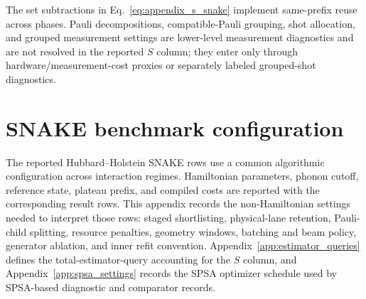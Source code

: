 \documentclass[
  reprint,
  amsmath,
  amssymb,
  aps,
  pra,
  nofootinbib,
  superscriptaddress,
  floatfix
]{revtex4-2}
\begin{document}
The set subtractions in Eq.~\eqref{eq:appendix_s_snake} implement same-prefix reuse across phases. Pauli decompositions, compatible-Pauli grouping, shot allocation, and grouped measurement settings are lower-level measurement diagnostics and are not resolved in the reported \(S\) column; they enter only through hardware/measurement-cost proxies or separately labeled grouped-shot diagnostics.

\section{SNAKE benchmark configuration}
\label{app:results_discussion}

The reported Hubbard--Holstein SNAKE rows use a common algorithmic
configuration across interaction regimes. Hamiltonian parameters, phonon
cutoff, reference state, plateau prefix, and compiled costs are reported with
the corresponding result rows. This appendix records the non-Hamiltonian
settings needed to interpret those rows: staged shortlisting, physical-lane
retention, Pauli-child splitting, resource penalties, geometry windows,
batching and beam policy, generator ablation, and inner refit convention.
Appendix~\ref{app:estimator_queries} defines the total-estimator-query
accounting for the \(S\) column, and Appendix~\ref{app:spsa_settings} records
the SPSA optimizer schedule used by SPSA-based diagnostic and comparator
records.
\end{document}
